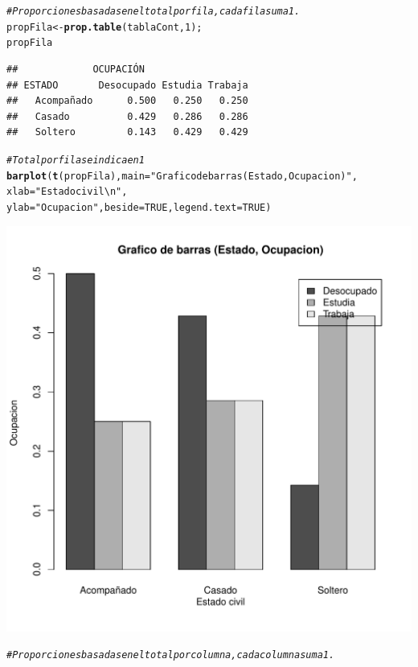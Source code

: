 \documentclass[12pt,letterpaper]{article}\usepackage[]{graphicx}\usepackage[]{color}
\makeatletter
\def\maxwidth{ %
  \ifdim\Gin@nat@width>\linewidth
    \linewidth
  \else
    \Gin@nat@width
  \fi
}
\newcommand{\hlnum}[1]{\textcolor[rgb]{0.686,0.059,0.569}{#1}}%
\newcommand{\hlstr}[1]{\textcolor[rgb]{0.192,0.494,0.8}{#1}}%
\newcommand{\hlcom}[1]{\textcolor[rgb]{0.678,0.584,0.686}{\textit{#1}}}%
\newcommand{\hlstd}[1]{\textcolor[rgb]{0.345,0.345,0.345}{#1}}%
\newcommand{\hlkwb}[1]{\textcolor[rgb]{0.69,0.353,0.396}{#1}}%
\newcommand{\hlkwc}[1]{\textcolor[rgb]{0.333,0.667,0.333}{#1}}%
\newcommand{\hlkwd}[1]{\textcolor[rgb]{0.737,0.353,0.396}{\textbf{#1}}}%
\newenvironment{kframe}{%
 \def\at@end@of@kframe{}%
 \ifinner\ifhmode%
  \def\at@end@of@kframe{\end{minipage}}%
  \begin{minipage}{\columnwidth}%
 \fi\fi%
 \def\FrameCommand##1{\hskip\@totalleftmargin \hskip-\fboxsep
 \colorbox{shadecolor}{##1}\hskip-\fboxsep
     \hskip-\linewidth \hskip-\@totalleftmargin \hskip\columnwidth}%
 \MakeFramed {\advance\hsize-\width
   \@totalleftmargin\z@ \linewidth\hsize
   \@setminipage}}%
 {\par\unskip\endMakeFramed%
 \at@end@of@kframe}
\newenvironment{knitrout}{}{} %
\makeatother
\begin{document}
\begin{knitrout}
\begin{kframe}\begin{alltt}
\hlcom{# Proporciones basadas en el total por fila, cada fila suma 1.}
\hlstd{propFila} \hlkwb{<-} \hlkwd{prop.table}\hlstd{(tablaCont,} \hlnum{1}\hlstd{);}
\hlstd{propFila}
\end{alltt}
\begin{verbatim}
##             OCUPACIÓN
## ESTADO       Desocupado Estudia Trabaja
##   Acompañado      0.500   0.250   0.250
##   Casado          0.429   0.286   0.286
##   Soltero         0.143   0.429   0.429
\end{verbatim}
\begin{alltt}
\hlcom{# Total por fila se indica en 1}
\hlkwd{barplot}\hlstd{(}\hlkwd{t}\hlstd{(propFila),} \hlkwc{main}\hlstd{=}\hlstr{"Grafico de barras (Estado, Ocupacion)"}\hlstd{,}
        \hlkwc{xlab}\hlstd{=}\hlstr{"Estado civil\textbackslash{}n"}\hlstd{,}
\hlkwc{ylab}\hlstd{=}\hlstr{"Ocupacion"}\hlstd{,} \hlkwc{beside}\hlstd{=}\hlnum{TRUE}\hlstd{,} \hlkwc{legend.text}\hlstd{=}\hlnum{TRUE}\hlstd{)}
\end{alltt}
\end{kframe}
\includegraphics[width=\maxwidth]{figure/unnamed-chunk-7-2} 
\begin{kframe}\begin{alltt}
\hlcom{# Proporciones basadas en el total por columna, cada columna suma 1.}

\end{alltt}
\end{kframe}
\end{knitrout}
\end{document}
